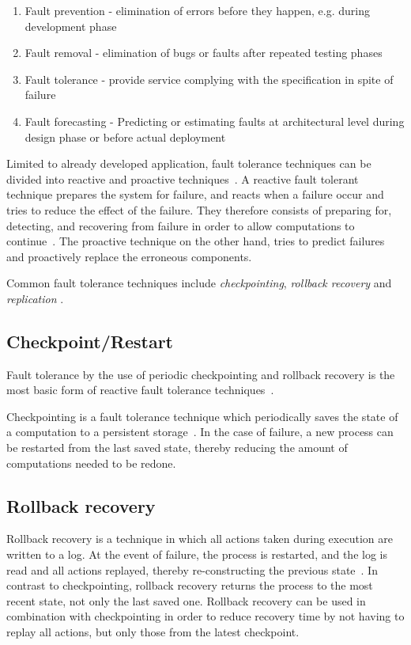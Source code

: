 \documentclass{cslthse-msc}
\begin{document}
\begin{enumerate}
\item Fault prevention - elimination of errors before they happen, e.g. during development phase
\item Fault removal - elimination of bugs or faults after repeated testing phases
\item Fault tolerance - provide service complying with the specification in spite of failure
\item Fault forecasting - Predicting or estimating faults at architectural level during design phase or before actual deployment
\end{enumerate}

Limited to already developed application, fault tolerance techniques can be divided into reactive and proactive techniques~\cite{faultToleranceChallenges}. A reactive fault tolerant technique prepares the system for failure, and reacts when a failure occur and tries to reduce the effect of the failure. They therefore consists of preparing for, detecting, and recovering from failure in order to allow computations to continue~\cite{relGridSystems}. The proactive technique on the other hand, tries to predict failures and proactively replace the erroneous components.

Common fault tolerance techniques include \emph{checkpointing}, \emph{rollback recovery} and \emph{replication} \cite{relGridSystems}.

\subsection{Checkpoint/Restart} \label{subsec:background_checkpoint}
Fault tolerance by the use of periodic checkpointing and rollback recovery is the most basic form of reactive fault tolerance techniques~\cite{surveyFaultParallel}.

Checkpointing is a fault tolerance technique which periodically saves the state of a computation to a persistent storage~\cite{relGridSystems, surveyFaultParallel}. In the case of failure, a new process can be restarted from the last saved state, thereby reducing the amount of computations needed to be redone.

\subsection{Rollback recovery} \label{subsec:background_rollback}
Rollback recovery is a technique in which all actions taken during execution are written to a log. At the event of failure, the process is restarted, and the log is read and all actions replayed, thereby re-constructing the previous state~\cite{surveyFaultParallel}. In contrast to checkpointing, rollback recovery returns the process to the most recent state, not only the last saved one. Rollback recovery can be used in combination with checkpointing in order to reduce recovery time by not having to replay all actions, but only those from the latest checkpoint.
\end{document}
